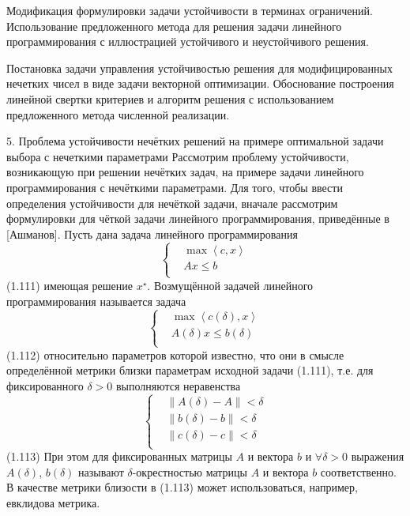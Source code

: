Модификация формулировки задачи устойчивости в терминах ограничений. Использование предложенного метода для решения задачи линейного программирования с иллюстрацией устойчивого и неустойчивого решения. 

Постановка задачи управления устойчивостью решения для модифицированных нечетких чисел в виде задачи векторной оптимизации. Обоснование построения линейной свертки критериев и алгоритм решения с использованием предложенного метода численной реализации.


5. Проблема устойчивости нечётких решений на примере оптимальной задачи выбора с нечеткими параметрами
Рассмотрим проблему устойчивости, возникающую при решении нечётких задач, на примере задачи линейного программирования с нечёткими параметрами. Для того, чтобы ввести определения устойчивости для нечёткой задачи, вначале рассмотрим формулировки для чёткой задачи линейного программирования, приведённые в [Ашманов].
Пусть дана задача линейного программирования
	\[\left\{ \begin{aligned}
  & \max \left\langle c,x \right\rangle  \\ 
 & Ax\le b \\ 
\end{aligned} \right.\] 	(1.111)
имеющая решение ${{x}^{\star}}$. Возмущённой задачей линейного программирования называется задача
	\[\left\{ \begin{aligned}
  & \max \left\langle c\left( \delta  \right),x \right\rangle  \\ 
 & A\left( \delta  \right)x\le b\left( \delta  \right) \\ 
\end{aligned} \right.\] 	(1.112)
относительно параметров которой известно, что они в смысле определённой метрики близки параметрам исходной задачи (1.111), т.е. для фиксированного $\delta >0$ выполняются неравенства
	\[\left\{ \begin{aligned}
  & \left\| A\left( \delta  \right)-A \right\|<\delta  \\ 
 & \left\| b\left( \delta  \right)-b \right\|<\delta  \\ 
 & \left\| c\left( \delta  \right)-c \right\|<\delta  \\ 
\end{aligned} \right.\] 	(1.113)
При этом для фиксированных матрицы $A$ и вектора $b$ и $\forall \delta >\text{0}$ выражения $A\left( \delta  \right)$, $b\left( \delta  \right)$ называют $\delta$-окрестностью матрицы $A$ и вектора $b$ соответственно. В качестве метрики близости в (1.113) может использоваться, например, евклидова метрика.
